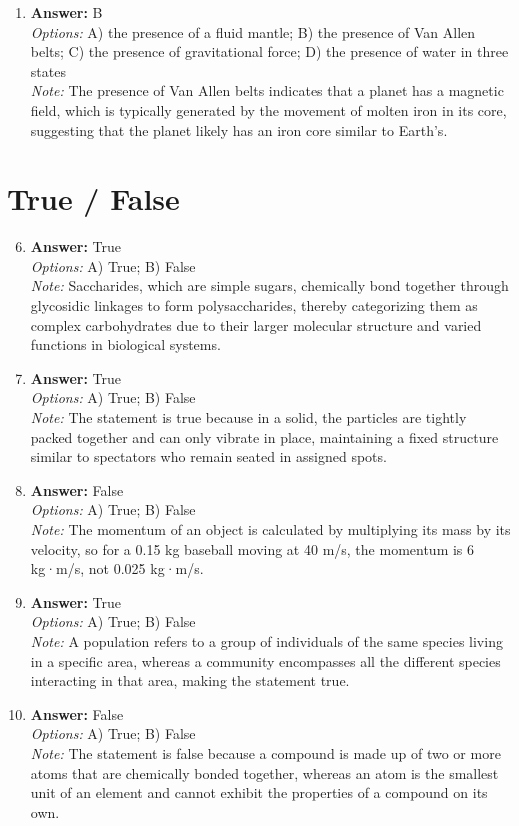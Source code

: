 \documentclass[12pt]{article}
\begin{document}
\begin{enumerate}[label=\arabic*.]
\item \textbf{Answer:} B
\\ \textit{Options:} A) the presence of a fluid mantle; B) the presence of Van Allen belts; C) the presence of gravitational force; D) the presence of water in three states
\\ \textit{Note:} The presence of Van Allen belts indicates that a planet has a magnetic field, which is typically generated by the movement of molten iron in its core, suggesting that the planet likely has an iron core similar to Earth's.
\end{enumerate}

\section*{True / False}
\begin{enumerate}[label=\arabic*.]
\setcounter{enumi}{5}
\item \textbf{Answer:} True
\\ \textit{Options:} A) True; B) False
\\ \textit{Note:} Saccharides, which are simple sugars, chemically bond together through glycosidic linkages to form polysaccharides, thereby categorizing them as complex carbohydrates due to their larger molecular structure and varied functions in biological systems.
\item \textbf{Answer:} True
\\ \textit{Options:} A) True; B) False
\\ \textit{Note:} The statement is true because in a solid, the particles are tightly packed together and can only vibrate in place, maintaining a fixed structure similar to spectators who remain seated in assigned spots.
\item \textbf{Answer:} False
\\ \textit{Options:} A) True; B) False
\\ \textit{Note:} The momentum of an object is calculated by multiplying its mass by its velocity, so for a 0.15 kg baseball moving at 40 m/s, the momentum is 6 kg·m/s, not 0.025 kg·m/s.
\item \textbf{Answer:} True
\\ \textit{Options:} A) True; B) False
\\ \textit{Note:} A population refers to a group of individuals of the same species living in a specific area, whereas a community encompasses all the different species interacting in that area, making the statement true.
\item \textbf{Answer:} False
\\ \textit{Options:} A) True; B) False
\\ \textit{Note:} The statement is false because a compound is made up of two or more atoms that are chemically bonded together, whereas an atom is the smallest unit of an element and cannot exhibit the properties of a compound on its own.
\end{enumerate}
\end{document}
